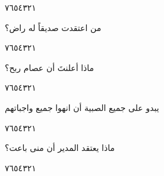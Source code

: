 \documentclass[11pt, a4paper]{article}
\begin{document}
{\begin{center}
        \hfill\textarabic{٧}\hfill\textarabic{٦}\hfill\textarabic{٥}\hfill\textarabic{٤}\hfill\textarabic{٣}\hfill\textarabic{٢}\hfill\textarabic{١}
        \end{center}


\vspace{0.5\baselineskip}\begin{flushright}
\textarabic{من اعتقدت صديقاً له راض؟}
\end{flushright}

\begin{center}
        \hfill\textarabic{٧}\hfill\textarabic{٦}\hfill\textarabic{٥}\hfill\textarabic{٤}\hfill\textarabic{٣}\hfill\textarabic{٢}\hfill\textarabic{١}
        \end{center}


\vspace{0.5\baselineskip}\begin{flushright}
\textarabic{ماذا أعلنتَ أن عصام ربح؟}
\end{flushright}

\begin{center}
        \hfill\textarabic{٧}\hfill\textarabic{٦}\hfill\textarabic{٥}\hfill\textarabic{٤}\hfill\textarabic{٣}\hfill\textarabic{٢}\hfill\textarabic{١}
        \end{center}
		
\vfill\clearpage

\vspace{0.5\baselineskip}\begin{flushright}
\textarabic{يبدو على جميع الصبية أن انهوا جميع واجباتهم}
\end{flushright}

\begin{center}
        \hfill\textarabic{٧}\hfill\textarabic{٦}\hfill\textarabic{٥}\hfill\textarabic{٤}\hfill\textarabic{٣}\hfill\textarabic{٢}\hfill\textarabic{١}
        \end{center}


\vspace{0.5\baselineskip}\begin{flushright}
\textarabic{ماذا يعتقد المدير أن منى باعت؟}
\end{flushright}

\begin{center}
        \hfill\textarabic{٧}\hfill\textarabic{٦}\hfill\textarabic{٥}\hfill\textarabic{٤}\hfill\textarabic{٣}\hfill\textarabic{٢}\hfill\textarabic{١}
        \end{center}


}
\end{document}

